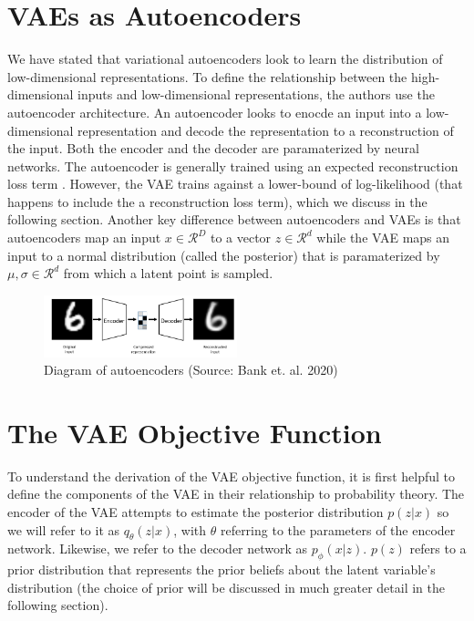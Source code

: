 \documentclass[./dissertation.tex]{subfiles}
\begin{document}
    \section{VAEs as Autoencoders}
    We have stated that variational autoencoders look to learn the distribution of low-dimensional representations. To define the relationship between the high-dimensional inputs and low-dimensional representations, the authors use the autoencoder architecture. An autoencoder looks to enocde an input into a low-dimensional representation and decode the representation to a reconstruction of the input. Both the encoder and the decoder are paramaterized by neural networks. The autoencoder is generally trained using an expected reconstruction loss term \cite{bank2020autoencoders}. However, the VAE trains against a lower-bound of log-likelihood (that happens to include the a reconstruction loss term), which we discuss in the following section. Another key difference between autoencoders and VAEs is that autoencoders map an input $x \in \mathcal{R}^{D}$ to a vector $z \in \mathcal{R}^{d}$ while the VAE maps an input to a normal distribution (called the posterior) that is paramaterized by $\mu, \sigma \in \mathcal{R}^{d}$ from which a latent point is sampled. 
    
    \begin{figure}[h]
        \centering\includegraphics[width=0.5\textwidth]{figures/autoencoder.PNG}
        \caption{Diagram of autoencoders (Source: Bank et. al. 2020)}
        \label{Autoencoder Diagram}
    \end{figure}
    
    \section{The VAE Objective Function}
    To understand the derivation of the VAE objective function, it is first helpful to define the components of the VAE in their relationship to probability theory. The encoder of the VAE attempts to estimate the posterior distribution $p(z|x)$ so we will refer to it as $q_{\theta}(z|x)$, with $\theta$ referring to the parameters of the encoder network. Likewise, we refer to the decoder network as $p_{\phi}(x|z)$. $p(z)$ refers to a prior distribution that represents the prior beliefs about the latent variable's distribution (the choice of prior will be discussed in much greater detail in the following section). 
    
\end{document}
